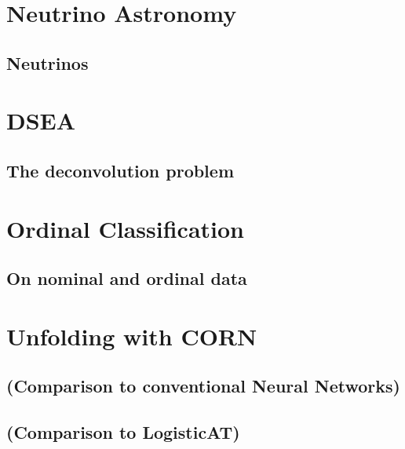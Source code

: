 
\chapter{Neutrino Astronomy}
  \section{Neutrinos}
  \blindtext[8]
  
\chapter{DSEA}
  \section{The deconvolution problem} %
  \blindtext[3]
  
\chapter{Ordinal Classification}
  \section{On nominal and ordinal data}
  \blindtext[3]
  
\chapter{Unfolding with CORN}
  
  
  
  
  \section{(Comparison to conventional Neural Networks)}
  \section{(Comparison to LogisticAT)}

